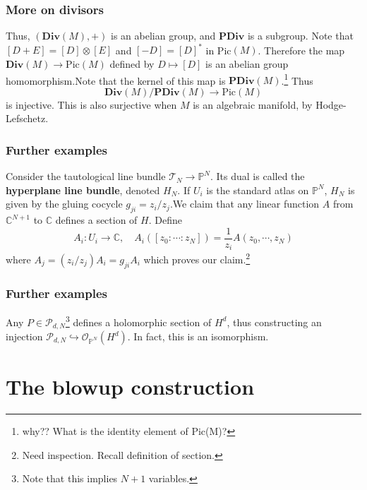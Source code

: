 \documentclass{beamer}
\begin{document}
\begin{frame}
\frametitle{More on divisors}

Thus, $(\textbf{Div}(M),+)$ is an abelian group, and $\textbf{PDiv}$ is a subgroup. \newline Note that $[D+E] = [D] \otimes [E]$ and $[-D] = [D]^*$ in Pic$(M)$. \newline Therefore the map $\textbf{Div}(M) \to \text{Pic}(M)$ defined by $D \mapsto [D]$ is an abelian group homomorphism.\newline Note that the kernel of this map is $\textbf{PDiv}(M)$.\footnote{why?? What is the identity element of Pic(M)?} Thus \[\textbf{Div}(M)/\textbf{PDiv}(M) \to \text{Pic}(M)\] is injective. This is also surjective when $M$ is an algebraic manifold, by Hodge-Lefschetz.

\end{frame}


\begin{frame}
\frametitle{Further examples}

Consider the tautological line bundle $\mathcal{T}_N \to \mathbb{P}^N$. Its dual is called the \textbf{hyperplane line bundle}, denoted $H_N$. If $U_i$ is the standard atlas on $\mathbb{P}^N$, $H_N$ is given by the gluing cocycle $g_{ji} = z_i/z_j$.\newline We claim that any linear function $A$ from $\mathbb{C}^{N+1}$ to $\mathbb{C}$ defines a section of $H$. \newline Define \[A_i:U_i \to \mathbb{C}, \quad A_i([z_0:\cdots:z_N]) = \frac{1}{z_i}A(z_0,\cdots,z_N)\] where $A_j = (z_i/z_j)A_i = g_{ji}A_i$ which proves our claim.\footnote{Need inspection. Recall definition of section.}

\end{frame}

\begin{frame}
\frametitle{Further examples}

Any $P \in \mathcal{P}_{d,N}$\footnote{Note that this implies $N+1$ variables.} defines a holomorphic section of $H^d$, thus constructing an injection $\mathcal{P}_{d,N} \hookrightarrow \mathcal{O}_{\mathbb{P}^N}(H^d)$. \newline In fact, this is an isomorphism.

\end{frame}

\section{The blowup construction}
\end{document}

